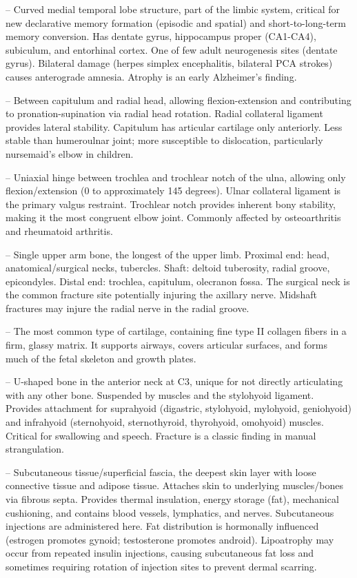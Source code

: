 -- Curved medial temporal lobe structure, part of the limbic system, critical for new declarative memory formation (episodic and spatial) and short-to-long-term memory conversion. Has dentate gyrus, hippocampus proper (CA1-CA4), subiculum, and entorhinal cortex. One of few adult neurogenesis sites (dentate gyrus). Bilateral damage (herpes simplex encephalitis, bilateral PCA strokes) causes anterograde amnesia. Atrophy is an early Alzheimer's finding.

-- Between capitulum and radial head, allowing flexion-extension and contributing to pronation-supination via radial head rotation. Radial collateral ligament provides lateral stability. Capitulum has articular cartilage only anteriorly. Less stable than humeroulnar joint; more susceptible to dislocation, particularly nursemaid's elbow in children.

-- Uniaxial hinge between trochlea and trochlear notch of the ulna, allowing only flexion/extension (0 to approximately 145 degrees). Ulnar collateral ligament is the primary valgus restraint. Trochlear notch provides inherent bony stability, making it the most congruent elbow joint. Commonly affected by osteoarthritis and rheumatoid arthritis.

-- Single upper arm bone, the longest of the upper limb. Proximal end: head, anatomical/surgical necks, tubercles. Shaft: deltoid tuberosity, radial groove, epicondyles. Distal end: trochlea, capitulum, olecranon fossa. The surgical neck is the common fracture site potentially injuring the axillary nerve. Midshaft fractures may injure the radial nerve in the radial groove.

-- The most common type of cartilage, containing fine type II collagen fibers in a firm, glassy matrix. It supports airways, covers articular surfaces, and forms much of the fetal skeleton and growth plates.

-- U-shaped bone in the anterior neck at C3, unique for not directly articulating with any other bone. Suspended by muscles and the stylohyoid ligament. Provides attachment for suprahyoid (digastric, stylohyoid, mylohyoid, geniohyoid) and infrahyoid (sternohyoid, sternothyroid, thyrohyoid, omohyoid) muscles. Critical for swallowing and speech. Fracture is a classic finding in manual strangulation.

-- Subcutaneous tissue/superficial fascia, the deepest skin layer with loose connective tissue and adipose tissue. Attaches skin to underlying muscles/bones via fibrous septa. Provides thermal insulation, energy storage (fat), mechanical cushioning, and contains blood vessels, lymphatics, and nerves. Subcutaneous injections are administered here. Fat distribution is hormonally influenced (estrogen promotes gynoid; testosterone promotes android). Lipoatrophy may occur from repeated insulin injections, causing subcutaneous fat loss and sometimes requiring rotation of injection sites to prevent dermal scarring.

